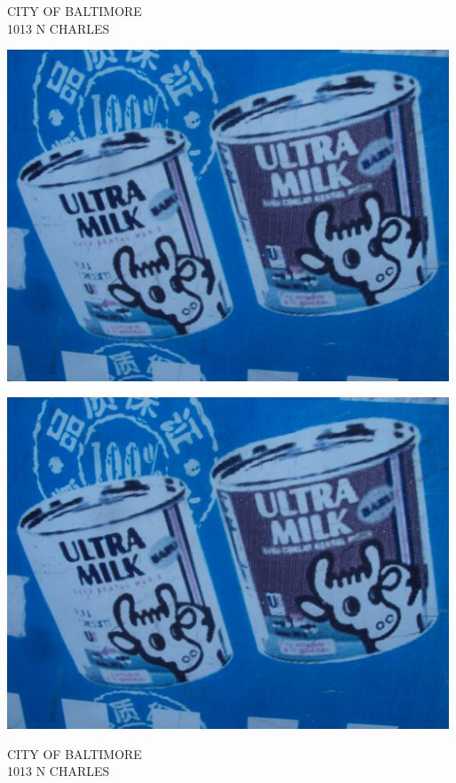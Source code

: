 \documentclass[10pt,letterpaper]{article}
\begin{document}
CITY OF BALTIMORE\\
1013 N CHARLES\\
\pagebreak

\includegraphics[width=5.19in]{landscape.jpg}

\vspace{0.25in}
\includegraphics[width=5.19in]{landscape.jpg}

CITY OF BALTIMORE\\
1013 N CHARLES\\
\pagebreak
\end{document}

